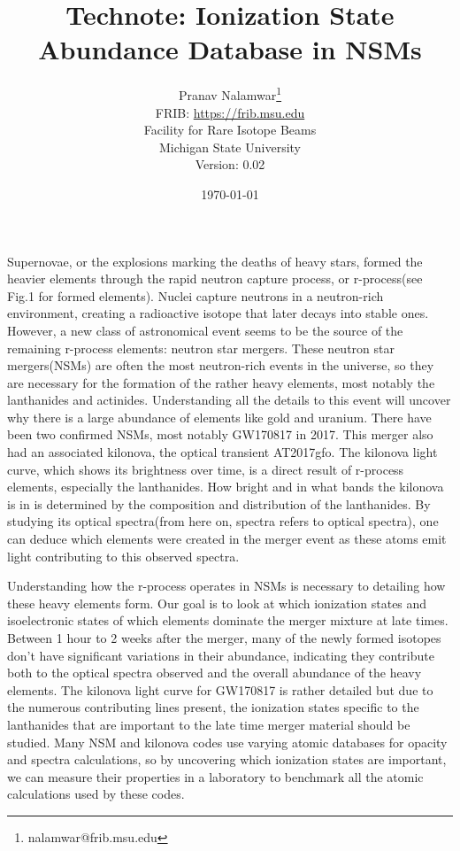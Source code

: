 \documentclass[11pt,a4paper]{article}
\begin{document}
\title{Technote: Ionization State Abundance Database in NSMs}
\author{Pranav Nalamwar\footnote{nalamwar@frib.msu.edu}\\FRIB: \url{https://frib.msu.edu}\\Facility for Rare Isotope Beams\\Michigan State University\\Version: 0.02} 
\date{\today}

\maketitle

\par 
Supernovae, or the explosions marking the deaths of heavy stars, formed the heavier elements through the rapid neutron capture process, or r-process(see Fig.1 for formed elements). Nuclei capture neutrons in a neutron-rich environment, creating a radioactive isotope that later decays into stable ones. However, a new class of astronomical event seems to be the source of the remaining r-process elements: neutron star mergers. These neutron star mergers(NSMs) are often the most neutron-rich events in the universe, so they are necessary for the formation of the rather heavy elements, most notably the lanthanides and actinides. Understanding all the details to this event will uncover why there is a large abundance of elements like gold and uranium. There have been two confirmed NSMs, most notably GW170817 in 2017. This merger also had an associated kilonova, the optical transient AT2017gfo. The kilonova light curve, which shows its brightness over time, is a direct result of r-process elements, especially the lanthanides. How bright and in what bands the kilonova is in is determined by the composition and distribution of the lanthanides. By studying its optical spectra(from here on, spectra refers to optical spectra), one can deduce which elements were created in the merger event as these atoms emit light contributing to this observed spectra.\par 
Understanding how the r-process operates in NSMs is necessary to detailing how these heavy elements form. Our goal is to look at which ionization states and isoelectronic states of which elements dominate the merger mixture at late times. Between 1 hour to 2 weeks after the merger, many of the newly formed isotopes don’t have significant variations in their abundance, indicating they contribute both to the optical spectra observed and the overall abundance of the heavy elements. The kilonova light curve for GW170817 is rather detailed but due to the numerous contributing lines present, the ionization states specific to the lanthanides that are important to the late time merger material should be studied. Many NSM and kilonova codes use varying atomic databases for opacity and spectra calculations, so by uncovering which ionization states are important, we can measure their properties in a laboratory to benchmark all the atomic calculations used by these codes. 
\end{document}
